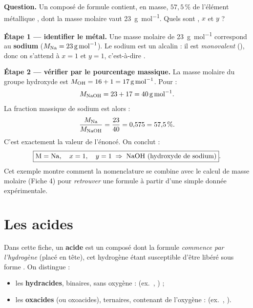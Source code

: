 \documentclass[11pt,a4paper]{article}
\begin{document}
\begin{exemple}
\textbf{Question.} Un composé de formule  contient, en masse, $57{,}5\,\%$ de l'élément
métallique , dont la masse molaire vaut \SI{23}{\gram\per\mole}. Quels sont , $x$ et $y$ ?

\smallskip
\textbf{Étape 1 — identifier le métal.} Une masse molaire de \SI{23}{\gram\per\mole} correspond au
\textbf{sodium}  ($M_{\ce{Na}} = \SI{23}{\gram\per\mole}$). Le sodium est un alcalin : il est
\emph{monovalent} (), donc on s'attend à $x = 1$ et $y = 1$, c'est-à-dire .

\textbf{Étape 2 — vérifier par le pourcentage massique.} La masse molaire du groupe hydroxyde est
$M_{\ce{OH}} = 16 + 1 = \SI{17}{\gram\per\mole}$. Pour  :
\[ M_{\ce{NaOH}} = 23 + 17 = \SI{40}{\gram\per\mole}. \]
La fraction massique de sodium est alors :
\[ \frac{M_{\ce{Na}}}{M_{\ce{NaOH}}} = \frac{23}{40} = 0{,}575 = 57{,}5\,\%. \]
C'est exactement la valeur de l'énoncé. On conclut :
\[ \boxed{\ce{M} = \ce{Na},\quad x = 1,\quad y = 1 \;\Rightarrow\; \ce{NaOH}\ \text{(hydroxyde de sodium)}}. \]
Cet exemple montre comment la nomenclature se combine avec le calcul de masse molaire (Fiche 4) pour
\emph{retrouver} une formule à partir d'une simple donnée expérimentale.
\end{exemple}

\section{Les acides}
\begin{definition}
Dans cette fiche, un \textbf{acide} est un composé dont la formule \emph{commence par l'hydrogène}
 (placé en tête), cet hydrogène étant susceptible d'être libéré sous forme . On distingue :
\begin{itemize}[leftmargin=1.6em,topsep=2pt,itemsep=1pt]
  \item les \textbf{hydracides}, binaires, sans oxygène :  (ex.\ , ) ;
  \item les \textbf{oxacides} (ou oxoacides), ternaires, contenant de l'oxygène : 
        (ex.\ , ).
\end{itemize}
\end{definition}
\end{document}
